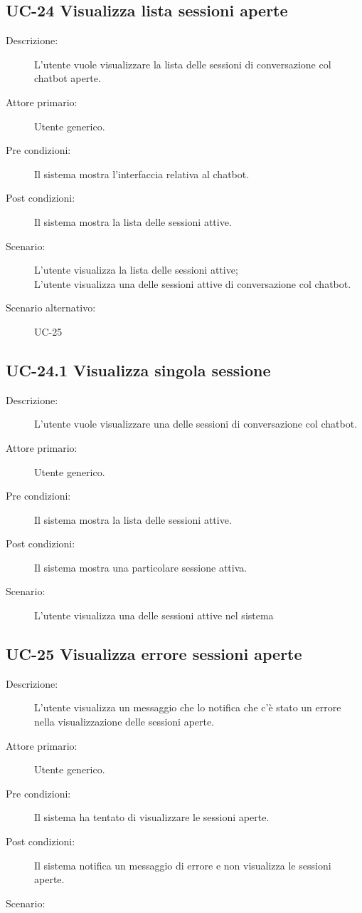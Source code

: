 \subsection{UC-24 Visualizza lista sessioni aperte}
\begin{description}
    \item[Descrizione:] L'utente vuole visualizzare la lista delle sessioni di conversazione col chatbot aperte.
    \item[Attore primario:] Utente generico.
    \item[Pre condizioni:] Il sistema mostra l'interfaccia relativa al chatbot.
    \item[Post condizioni:] Il sistema mostra la lista delle sessioni attive.
    \item[Scenario:] L'utente visualizza la lista delle sessioni attive;\\L'utente visualizza una delle sessioni attive di conversazione col chatbot.
    \item[Scenario alternativo:] UC-25
\end{description}

\subsection{UC-24.1 Visualizza singola sessione}
\begin{description}
    \item[Descrizione:] L'utente vuole visualizzare una delle sessioni di conversazione col chatbot.
    \item[Attore primario:] Utente generico.
    \item[Pre condizioni:] Il sistema mostra la lista delle sessioni attive.
        \item[Post condizioni:] Il sistema mostra una particolare sessione attiva.
    \item[Scenario:] L'utente visualizza una delle sessioni attive nel sistema
\end{description}

\subsection{UC-25 Visualizza errore sessioni aperte }
\begin{description}
    \item[Descrizione:] L'utente visualizza un messaggio che lo notifica che c'è stato un errore nella visualizzazione delle sessioni aperte.
    \item[Attore primario:] Utente generico.
    \item[Pre condizioni:] Il sistema ha tentato di visualizzare le sessioni aperte.
    \item[Post condizioni:] Il sistema notifica un messaggio di errore e non visualizza le sessioni aperte.
    \item[Scenario:] 
\end{description}

